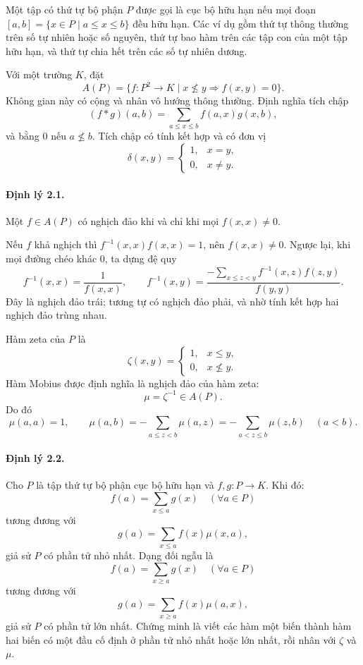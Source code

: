 \documentclass[11pt]{article}
\begin{document}
Một tập có thứ tự bộ phận \(P\) được gọi là cục bộ hữu hạn nếu mọi đoạn
\([a,b]=\{x\in P\mid a\le x\le b\}\) đều hữu hạn. Các ví dụ gồm thứ tự thông
thường trên số tự nhiên hoặc số nguyên, thứ tự bao hàm trên các tập con của
một tập hữu hạn, và thứ tự chia hết trên các số tự nhiên dương.

Với một trường \(K\), đặt
\[
A(P)=\{f:P^2\to K\mid x\nleq y\Rightarrow f(x,y)=0\}.
\]
Không gian này có cộng và nhân vô hướng thông thường. Định nghĩa tích chập
\[
(f*g)(a,b)=\sum_{a\le x\le b} f(a,x)g(x,b),
\]
và bằng \(0\) nếu \(a\nleq b\). Tích chập có tính kết hợp và có đơn vị
\[
\delta(x,y)=
\begin{cases}
1,&x=y,\\
0,&x\ne y.
\end{cases}
\]

\paragraph{Định lý 2.1.}
Một \(f\in A(P)\) có nghịch đảo khi và chỉ khi mọi \(f(x,x)\ne 0\).

Nếu \(f\) khả nghịch thì \(f^{-1}(x,x)f(x,x)=1\), nên \(f(x,x)\ne0\). Ngược
lại, khi mọi đường chéo khác \(0\), ta dựng đệ quy
\[
f^{-1}(x,x)=\frac1{f(x,x)},\qquad
f^{-1}(x,y)=\frac{-\sum_{x\le z<y}f^{-1}(x,z)f(z,y)}{f(y,y)}.
\]
Đây là nghịch đảo trái; tương tự có nghịch đảo phải, và nhờ tính kết hợp hai
nghịch đảo trùng nhau.

Hàm zeta của \(P\) là
\[
\zeta(x,y)=
\begin{cases}
1,&x\le y,\\
0,&x\nleq y.
\end{cases}
\]
Hàm Mobius được định nghĩa là nghịch đảo của hàm zeta:
\[
\mu=\zeta^{-1}\in A(P).
\]
Do đó
\[
\mu(a,a)=1,\qquad
\mu(a,b)=-\sum_{a\le z<b}\mu(a,z)
=-\sum_{a<z\le b}\mu(z,b)\quad(a<b).
\]

\paragraph{Định lý 2.2.}
Cho \(P\) là tập thứ tự bộ phận cục bộ hữu hạn và \(f,g:P\to K\). Khi đó:
\[
f(a)=\sum_{x\le a}g(x)\quad(\forall a\in P)
\]
tương đương với
\[
g(a)=\sum_{x\le a}f(x)\mu(x,a),
\]
giả sử \(P\) có phần tử nhỏ nhất. Dạng đối ngẫu là
\[
f(a)=\sum_{x\ge a}g(x)\quad(\forall a\in P)
\]
tương đương với
\[
g(a)=\sum_{x\ge a}f(x)\mu(a,x),
\]
giả sử \(P\) có phần tử lớn nhất. Chứng minh là viết các hàm một biến thành
hàm hai biến có một đầu cố định ở phần tử nhỏ nhất hoặc lớn nhất, rồi nhân với
\(\zeta\) và \(\mu\).
\end{document}
